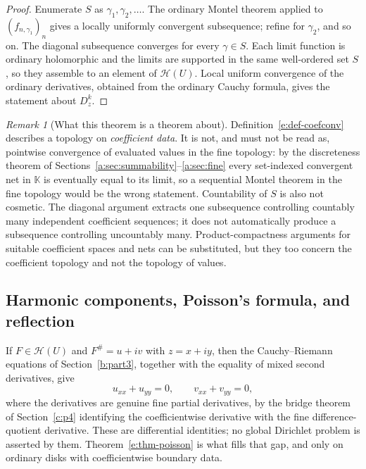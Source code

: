 \documentclass[11pt,a4paper]{article}
\numberwithin{equation}{section}
\theoremstyle{definition}
\theoremstyle{remark}
\newtheorem{remark}[theorem]{Remark}
\theoremstyle{plain}
\newcommand{\K}{\mathbb K}
\newcommand{\ev}[1]{#1^{\#}}
\newcommand{\Hc}{\mathcal H}
\begin{document}
\begin{proof}
Enumerate $S$ as $\gamma_1,\gamma_2,\dots$.  The ordinary Montel theorem
applied to $(f_{n,\gamma_1})_n$ gives a locally uniformly convergent
subsequence; refine for $\gamma_2$, and so on.  The diagonal subsequence
converges for every $\gamma\in S$.  Each limit function is ordinary
holomorphic and the limits are supported in the same well-ordered set $S$,
so they assemble to an element of $\Hc(U)$.  Local uniform convergence of
the ordinary derivatives, obtained from the ordinary Cauchy formula, gives
the statement about $D_z^k$.
\end{proof}

\begin{remark}[What this theorem is a theorem about]\label{e:rem-montelscope}
Definition~\ref{e:def-coefconv} describes a topology on \emph{coefficient
data}.  It is not, and must not be read as, pointwise convergence of
evaluated values in the fine topology: by the discreteness theorem of
Sections~\ref{a:sec:summability}--\ref{a:sec:fine} every set-indexed convergent net in $\K$ is eventually equal to its
limit, so a sequential Montel theorem in the fine topology would be the
wrong statement.  Countability of $S$ is also not cosmetic.  The diagonal
argument extracts one subsequence controlling countably many independent
coefficient sequences; it does not automatically produce a subsequence
controlling uncountably many.  Product-compactness arguments for suitable
coefficient spaces and nets can be substituted, but they too concern the
coefficient topology and not the topology of values.
\end{remark}

\subsection{Harmonic components, Poisson's formula, and reflection}
\label{e:sec-harmonic}

If $F\in\Hc(U)$ and $\ev F=u+iv$ with $z=x+iy$, then the Cauchy--Riemann
equations of Section~\ref{b:part3}, together with the equality of mixed second
derivatives, give
\[
 u_{xx}+u_{yy}=0,\qquad v_{xx}+v_{yy}=0,
\]
where the derivatives are genuine fine partial derivatives, by the bridge
theorem of Section~\ref{c:p4} identifying the coefficientwise derivative with the fine
difference-quotient derivative.  These are differential identities; no
global Dirichlet problem is asserted by them.  Theorem~\ref{e:thm-poisson}
is what fills that gap, and only on ordinary disks with coefficientwise
boundary data.
\end{document}
